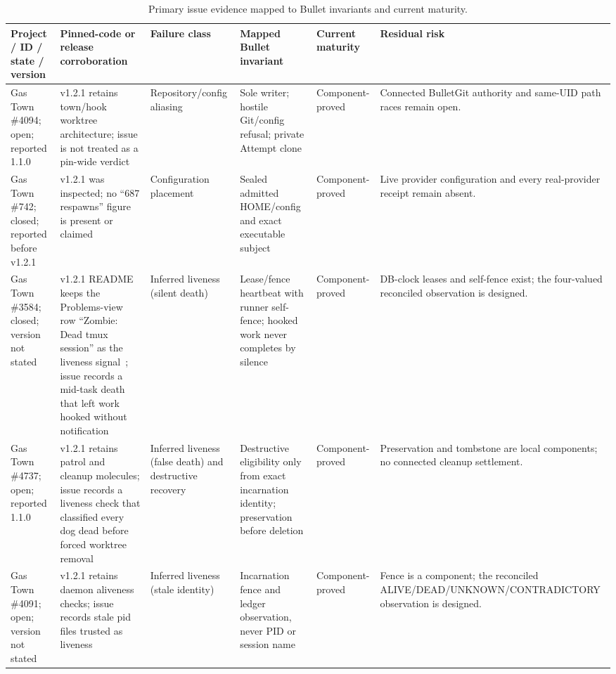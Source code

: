 \documentclass[journal]{IEEEtran}
\newcommand{\ComponentProved}{\textsf{Component-proved}}
\begin{document}
\begin{table}[!t]
\caption{Primary issue evidence mapped to Bullet invariants and current maturity.}
\label{tab:issues}
\centering
\tiny
\setlength{\tabcolsep}{2.5pt}
\begin{tabularx}{\textwidth}{@{}p{}p{}p{}p{}p{}X@{}}
\toprule
Project / ID / state / version & Pinned-code or release corroboration & Failure class & Mapped Bullet invariant & Current maturity & Residual risk \\
\midrule
Gas Town \#4094; open; reported 1.1.0~\cite{gastown4094} & v1.2.1 retains town/hook worktree architecture; issue is not treated as a pin-wide verdict & Repository/config aliasing & Sole writer; hostile Git/config refusal; private Attempt clone & \ComponentProved & Connected BulletGit authority and same-UID path races remain open. \\
Gas Town \#742; closed; reported before v1.2.1~\cite{gastown742} & v1.2.1 was inspected; no ``687 respawns'' figure is present or claimed & Configuration placement & Sealed admitted HOME/config and exact executable subject & \ComponentProved & Live provider configuration and every real-provider receipt remain absent. \\
Gas Town \#3584; closed; version not stated~\cite{gastown3584} & v1.2.1 README keeps the Problems-view row ``Zombie: Dead tmux session'' as the liveness signal~\cite{gastownReadme}; issue records a mid-task death that left work hooked without notification & Inferred liveness (silent death) & Lease/fence heartbeat with runner self-fence; hooked work never completes by silence & \ComponentProved & DB-clock leases and self-fence exist; the four-valued reconciled observation is designed. \\
Gas Town \#4737; open; reported 1.1.0~\cite{gastown4737} & v1.2.1 retains patrol and cleanup molecules; issue records a liveness check that classified every dog dead before forced worktree removal & Inferred liveness (false death) and destructive recovery & Destructive eligibility only from exact incarnation identity; preservation before deletion & \ComponentProved & Preservation and tombstone are local components; no connected cleanup settlement. \\
Gas Town \#4091; open; version not stated~\cite{gastown4091} & v1.2.1 retains daemon aliveness checks; issue records stale pid files trusted as liveness & Inferred liveness (stale identity) & Incarnation fence and ledger observation, never PID or session name & \ComponentProved & Fence is a component; the reconciled ALIVE/DEAD/UNKNOWN/CONTRADICTORY observation is designed. \\

\end{tabularx}
\end{table}
\end{document}
